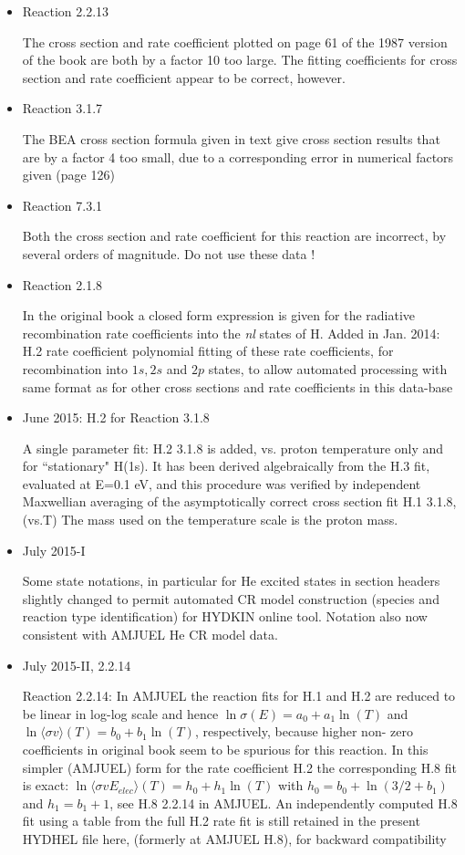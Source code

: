 \documentclass[12pt,dvipdfm]{article}
\begin{document}
\begin{itemize}
\item{Reaction 2.2.13}

The cross section and rate coefficient plotted on page 61 of the 1987 version of the book are both by
a factor 10 too large.
The fitting coefficients for  cross section and rate coefficient appear to be correct, however.

\item{Reaction 3.1.7}

The BEA cross section formula given in text give cross section results that are by a factor 4 too small,
due to a corresponding error in numerical factors given (page 126)

\item{Reaction 7.3.1}

Both the cross section and rate coefficient for this reaction are incorrect, by several orders of magnitude.
Do not use these data !

\item{Reaction 2.1.8}

In the original book a closed form expression is given for the radiative recombination rate coefficients
into the \emph{nl} states of H. Added in Jan. 2014:  H.2 rate coefficient polynomial fitting of these rate coefficients, for recombination into
$1s, 2s$ and $2p$ states, to allow
automated processing with same format as for other cross sections and rate coefficients in this data-base

\item{June 2015: H.2 for Reaction 3.1.8}

A single parameter fit: H.2  3.1.8 is added, vs. proton temperature only and for ``stationary" H(1s). It has been derived
algebraically from the H.3 fit, evaluated at
E=0.1 eV, and this procedure was verified by independent Maxwellian averaging of the asymptotically correct cross section fit H.1  3.1.8, (vs.T)
The mass used on the temperature scale is the proton mass.

\item{July 2015-I}

Some state notations, in particular for He excited states in section headers slightly changed to permit automated CR
model construction (species and reaction type identification) for HYDKIN online tool. Notation also now consistent with
AMJUEL He CR model data.

\item{July 2015-II,  2.2.14}

Reaction 2.2.14: In AMJUEL the reaction fits for H.1 and H.2 are reduced to be linear in log-log scale and hence $\ln \sigma(E) = a_0 + a_1 \ln(T)$ and $\ln \langle\sigma v\rangle(T) = b_0 + b_1 \ln(T)$, respectively,
because higher non-
zero coefficients in original book \cite{kn:Janev87} seem to be spurious for this reaction. In this simpler (AMJUEL) form for the rate coefficient H.2 the corresponding H.8 fit
is exact: $\ln \langle\sigma v E_{elec}\rangle(T) = h_0 +h_1 \ln(T)$ with $h_0 = b_0+\ln(3/2+b_1)$ and $h_1=b_1+1$, see H.8  2.2.14 in AMJUEL.
An independently computed H.8 fit using a table from the full H.2 rate fit is still retained in the present HYDHEL file here, (formerly at AMJUEL H.8),
for backward compatibility


\end{itemize}
\end{document}
